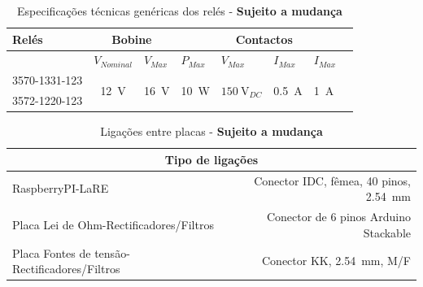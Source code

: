 \begin{table}[htb]
\caption{Especificações técnicas genéricas dos relés - \textbf{Sujeito a mudança}}
\centering
\begin{tabular}{lcclllll}
\toprule
Relés & \multicolumn{2}{c}{Bobine} & \multicolumn{5}{c}{Contactos}\\
\midrule
& \multicolumn{1}{l}{$V_{Nominal}$} & \multicolumn{1}{l}{$V_{Max}$} & $P_{Max}$ & $V_{Max}$ & $I_{Max}$ & $I_{Max}$\\
\midrule
3570-1331-123  & \multirow{2}{*}{\SI{12}{\volt}} & \multirow{2}{*}{\SI{16}{\volt}}  & \multirow{2}{*}{\SI{10}{\watt}} & \multirow{2}{*}{$\SI{150}{\volt}_{DC}$} & \multirow{2}{*}{\SI{0.5}{\ampere}} & \multirow{2}{*}{\SI{1}{\ampere}}\\
3572-1220-123 & & & & & & &\\                
\bottomrule
\end{tabular}%
\end{table}

\begin{table}[htb]
\caption{Ligações entre placas - \textbf{Sujeito a mudança}}
\centering
\begin{tabular}{lr}
\toprule
\multicolumn{2}{c}{Tipo de ligações}\\
\midrule
RaspberryPI-LaRE & Conector IDC, fêmea, 40 pinos, \SI{2.54}{\mm}\\
Placa Lei de Ohm-Rectificadores/Filtros & Conector de 6 pinos Arduino Stackable\\
Placa Fontes de tensão-Rectificadores/Filtros &  Conector KK, \SI{2.54}{\mm}, M/F \\
\bottomrule
\end{tabular}
\end{table}
\raggedright

\newpage

\tableofcontents
\listoftables

\newpage


